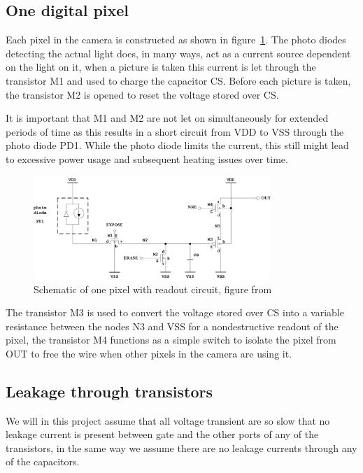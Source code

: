
\subsection{One digital pixel}\label{sec:oneDigitalPixel}


Each pixel in the camera is constructed as shown in figure~\ref{fig:pixelschematic}.
The photo diodes detecting the actual light does, in many ways, act as a current source dependent on the light on it, when a picture is taken this
current is let through the transistor M1 and used to charge the capacitor CS.
Before each picture is taken, the transistor M2 is opened to reset the voltage stored over CS.

It is important that M1 and M2 are not let on simultaneously for extended periods of time as this results in a short circuit from VDD to VSS through the photo diode PD1.
While the photo diode limits the current, this still might lead to excessive power usage and subsequent heating issues over time.


\begin{figure}[htbp]
  \centering
  \includegraphics[width=0.80\textwidth]{figures/pixel}
  \caption{Schematic of one pixel with readout circuit, figure from~\cite{oppgave}}\label{fig:pixelschematic}
\end{figure}


The transistor M3 is used to convert the voltage stored over CS into a variable resistance between the nodes N3 and VSS for a nondestructive readout of the pixel,
the transistor M4 functions as a simple switch to isolate the pixel from OUT to free the wire when other pixels in the camera are using it.


\subsection{Leakage through transistors}\label{sec:leakagecurrent}

We will in this project assume that all voltage transient are so slow that no leakage current is present between gate and the other ports of any of the transistors,
in the same way we assume there are no leakage currents through any of the capacitors.

